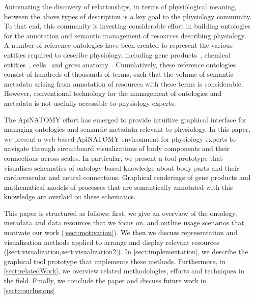 Automating the discovery of relationships, in terms of physiological meaning, between the above types of description is a key goal to the physiology community. To that end, this community is investing considerable effort in building ontologies for the annotation and semantic management of resources describing physiology. A number of reference ontologies have been created to represent the various entities required to describe physiology, including gene products~\cite{Bla+13}, chemical entities~\cite{HMD+13}, cells~\cite{BRA05} and gross anatomy~\cite{RM03}. Cumulatively, these reference ontologies consist of hundreds of thousands of terms, such that the volume of semantic metadata arising from annotation of resources with these terms is considerable. However, conventional technology for the management of ontologies and metadata is not usefully accessible to physiology experts.

The ApiNATOMY effort has emerged to provide intuitive graphical interface for managing ontologies and semantic metadata relevant to physiology. In this paper, we present a web-based ApiNATOMY environment for physiology experts to navigate through circuitboard visualizations of body components and their connections across scales. In particular, we present a tool prototype that visualizes schematics of ontology-based knowledge about body parts and their cardiovascular and neural connections. Graphical renderings of gene products and mathematical models of processes that are semantically annotated with this knowledge are overlaid on these schematics.

This paper is structured as follows: first, we give an overview of the ontology, metadata and data resources that we focus on, and outline usage scenarios that motivate our work (\cref{sect:motivation}).  We then we discuss representation and visualization methods applied to arrange and display relevant resources (\cref{sect:visualization,sect:visualization2}). In \cref{sect:implementation}, we describe the graphical tool prototype that implements these methods. Furthermore, in \cref{sect:relatedWork}, we overview related methodologies, efforts and techniques in the field. Finally, we conclude the paper and discuss future work in \cref{sect:conclusions}.
